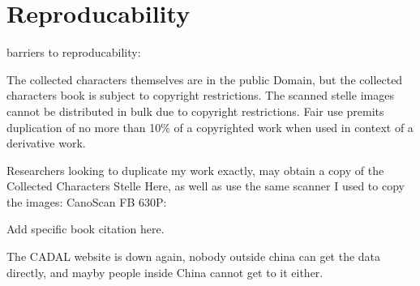 \chapter{Reproducability}


barriers to reproducability:

The collected characters themselves are in the public Domain, but the collected characters book is subject to copyright restrictions.  The scanned stelle images cannot be distributed in bulk due to copyright restrictions.  Fair use premits duplication of no more than 10\% of a copyrighted work when used in context of a derivative work.  

Researchers looking to duplicate my work exactly, may obtain a copy of the Collected Characters Stelle Here, as well as use the same scanner I used to copy the images:  CanoScan FB 630P:

Add specific book citation here.


The CADAL website is down again, nobody outside china can get the data directly, and mayby people inside China cannot get to it either.
